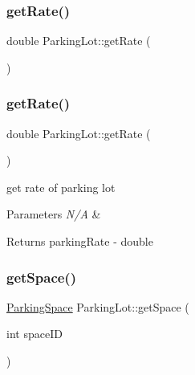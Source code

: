 \subsubsection{\texorpdfstring{get\+Rate()}{getRate()}\hspace{0.1cm}{\footnotesize\ttfamily [1/2]}}
{\footnotesize\ttfamily double Parking\+Lot\+::get\+Rate (\begin{DoxyParamCaption}{ }\end{DoxyParamCaption})}

\mbox{\label{class_parking_lot_abd4aba799c6f13e467ed0b5e17ef70eb}} 
\subsubsection{\texorpdfstring{get\+Rate()}{getRate()}\hspace{0.1cm}{\footnotesize\ttfamily [2/2]}}
{\footnotesize\ttfamily double Parking\+Lot\+::get\+Rate (\begin{DoxyParamCaption}{ }\end{DoxyParamCaption})}



get rate of parking lot 


\begin{DoxyParams}{Parameters}
{\em N/A} & \\
\hline
\end{DoxyParams}
\begin{DoxyReturn}{Returns}
parking\+Rate -\/ double 
\end{DoxyReturn}
\mbox{\label{class_parking_lot_ae9420690a078541084aa1fcb35f644fc}} 
\subsubsection{\texorpdfstring{get\+Space()}{getSpace()}\hspace{0.1cm}{\footnotesize\ttfamily [1/2]}}
{\footnotesize\ttfamily \mbox{\hyperlink{class_parking_space}{Parking\+Space}} Parking\+Lot\+::get\+Space (\begin{DoxyParamCaption}\item[{int}]{space\+ID }\end{DoxyParamCaption})}

